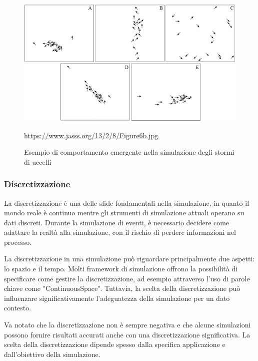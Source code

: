 \begin{figure}[H]
    \begin{center}
        \includegraphics[scale=1]{img/Figure6b.jpg}
        \caption{Esempio di comportamento emergente nella simulazione degli stormi di uccelli}
        \url{https://www.jasss.org/13/2/8/Figure6b.jpg}
        \label{fig:flock_emergent_behaviour}
    \end{center}
\end{figure}

\subsubsection{Discretizzazione}

La discretizzazione è una delle sfide fondamentali nella simulazione, 
in quanto il mondo reale è continuo mentre gli strumenti di simulazione 
attuali operano su dati discreti. Durante la simulazione di eventi, 
è necessario decidere come adattare la realtà alla simulazione, 
con il rischio di perdere informazioni nel processo.

La discretizzazione in una simulazione può riguardare principalmente 
due aspetti: lo spazio e il tempo. Molti framework di simulazione offrono 
la possibilità di specificare come gestire la discretizzazione, 
ad esempio attraverso l'uso di parole chiave come "ContinuousSpace". 
Tuttavia, la scelta della discretizzazione può influenzare 
significativamente l'adeguatezza della simulazione per un dato contesto.

Va notato che la discretizzazione non è sempre negativa e che alcune 
simulazioni possono fornire risultati accurati anche con una 
discretizzazione significativa. La scelta della discretizzazione 
dipende spesso dalla specifica applicazione e dall'obiettivo della simulazione.

